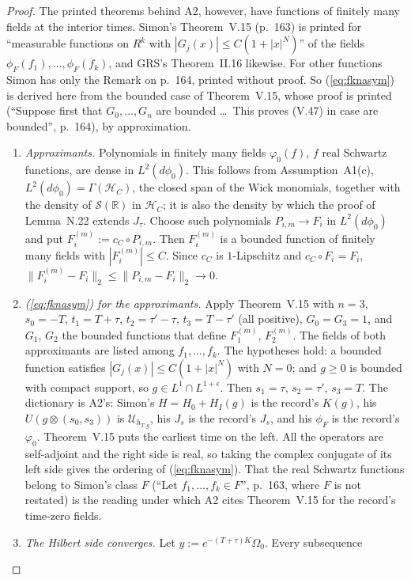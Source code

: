 \documentclass[11pt,a4paper]{article}
\newcommand{\R}{\mathbb{R}}
\newcommand{\HH}{\mathcal{H}}
\newcommand{\Om}{\Omega}
\newcommand{\Uc}{\mathcal U}
\newcommand{\dphi}{d\phi_0}
\theoremstyle{plain}
\theoremstyle{definition}
\begin{document}
\begin{proof}
The printed theorems behind A2, however, have functions of finitely many fields at the interior
times.  Simon's Theorem~V.15 (p.~163) is printed for ``measurable functions on $R^k$ with
$|G_j(x)|\le C(1+|x|^N)$'' of the fields $\phi_F(f_1),\dots,\phi_F(f_k)$, and GRS's
Theorem~II.16 likewise.  For other functions Simon has only the Remark on p.~164, printed without
proof.  So (\ref{eq:fknasym}) is derived here from the bounded case of Theorem~V.15, whose proof
is printed (``Suppose first that $G_0,\dots,G_n$ are bounded \dots\ This proves (V.47) in case are
bounded'', p.~164), by approximation.
\begin{enumerate}
\item[(1)] \emph{Approximants.}  Polynomials in finitely many fields $\varphi_0(f)$, $f$ real
Schwartz functions, are dense in $L^2(\dphi)$.  This follows from Assumption~A1(c),
$L^2(\dphi)=\Gamma(\HH_C)$, the closed span of the Wick monomials, together with the density of
$\mathcal S(\R)$ in $\HH_C$; it is also the density by which the proof of Lemma~N.22 extends
$J_\tau$.  Choose such polynomials $P_{i,m}\to F_i$ in $L^2(\dphi)$ and put
$F_i^{(m)}:=c_C\circ P_{i,m}$.  Then $F_i^{(m)}$ is a bounded function of finitely many fields
with $|F_i^{(m)}|\le C$.  Since $c_C$ is $1$-Lipschitz and $c_C\circ F_i=F_i$,
$\|F_i^{(m)}-F_i\|_2\le\|P_{i,m}-F_i\|_2\to0$.
\item[(2)] \emph{(\ref{eq:fknasym}) for the approximants.}  Apply Theorem~V.15 with $n=3$,
$s_0=-T$, $t_1=T+\tau$, $t_2=\tau'-\tau$, $t_3=T-\tau'$ (all positive), $G_0=G_3=1$, and $G_1$,
$G_2$ the bounded functions that define $F_1^{(m)}$, $F_2^{(m)}$.  The fields of both
approximants are listed among $f_1,\dots,f_k$.  The hypotheses hold: a bounded function satisfies
$|G_j(x)|\le C(1+|x|^N)$ with $N=0$; and $g\ge0$ is bounded with compact support, so
$g\in L^1\cap L^{1+\epsilon}$.  Then $s_1=\tau$, $s_2=\tau'$, $s_3=T$.  The dictionary is A2's:
Simon's $H=H_0+H_I(g)$ is the record's $K(g)$, his $U(g\otimes(s_0,s_3))$ is $\Uc_{h_{T,g}}$,
his $J_s$ is the record's $J_s$, and his $\phi_F$ is the record's $\varphi_0$.  Theorem~V.15
puts the earliest time on the left.  All the operators are self-adjoint and the right side is
real, so taking the complex conjugate of its left side gives the ordering of
(\ref{eq:fknasym}).  That the real Schwartz functions belong to Simon's class $F$ (``Let
$f_1,\dots,f_k\in F$'', p.~163, where $F$ is not restated) is the reading under which A2 cites
Theorem~V.15 for the record's time-zero fields.
\item[(3)] \emph{The Hilbert side converges.}  Let $y:=e^{-(T+\tau)K}\Om_0$.  Every subsequence

\end{enumerate}
\end{proof}
\end{document}
